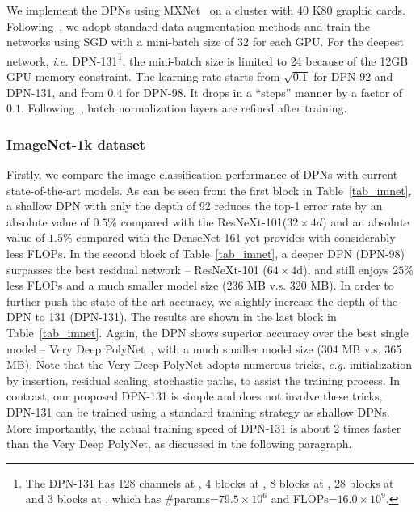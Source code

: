 \documentclass{article}
\begin{document}
We implement the DPNs using MXNet~\citep{chen2015mxnet} on a cluster with 40 K80 graphic cards. Following~\citep{ypChen2017}, we adopt standard data augmentation methods and train the networks using SGD with a mini-batch size of 32 for each GPU. For the deepest network, \emph{i.e.} DPN-131\footnote{The DPN-131 has 128 channels at {}, 4 blocks at {}, 8 blocks at {}, 28 blocks at {} and 3 blocks at {}, which has \#params=$79.5\times10^6$ and FLOPs=$16.0\times10^9$.}, the mini-batch size is limited to 24 because of the 12GB GPU memory constraint. The learning rate starts from $\sqrt{0.1}$ for DPN-92 and DPN-131, and from $0.4$ for DPN-98. It drops in a ``steps'' manner by a factor of $0.1$. Following~\cite{he2016deep}, batch normalization layers are refined after training.

\subsubsection{ImageNet-1k dataset}

Firstly, we compare the image classification performance of DPNs with current state-of-the-art models. As can be seen from the first block in Table~\ref{tab_imnet}, a shallow DPN with only the depth of 92 reduces the top-1 error rate by an absolute value of $0.5\%$ compared with the ResNeXt-101($32\times4d$) and an absolute value of $1.5\%$ compared with the DenseNet-161 yet provides with considerably less FLOPs. In the second block of Table~\ref{tab_imnet}, a deeper DPN (DPN-98) surpasses the best residual network -- ResNeXt-101 ($64\times4$d), and still enjoys $25\%$ less FLOPs and a much smaller model size (236 MB v.s. 320 MB). In order to further push the state-of-the-art accuracy, we slightly increase the depth of the DPN to 131 (DPN-131). The results are shown in the last block in Table~\ref{tab_imnet}. Again, the DPN shows superior accuracy over the best single model -- Very Deep PolyNet~\citep{zhang2016polynet}, with a much smaller model size (304 MB v.s. 365 MB). Note that the Very Deep PolyNet adopts numerous tricks, \emph{e.g.} initialization by insertion, residual scaling, stochastic paths, to assist the training process. In contrast, our proposed DPN-131 is simple and does not involve these tricks, DPN-131 can be trained using a standard training strategy as shallow DPNs. More importantly, the actual training speed of DPN-131 is about 2 times faster than the Very Deep PolyNet, as discussed in the following paragraph.
\end{document}
